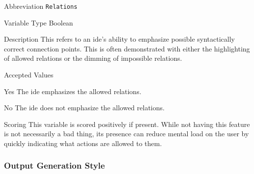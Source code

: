 \begin{AlignedDesc}
  \item[Abbreviation] \texttt{Relations}

  \item[Variable Type] Boolean

  \item[Description] This refers to an \ac{ide}'s ability to emphasize
  possible syntactically correct connection points. This is often
  demonstrated with either the highlighting of allowed relations or the
  dimming of impossible relations.

  \item[Accepted Values]

  \begin{AlignedDesc}
    \item[Yes] The \ac{ide} emphasizes the allowed relations.
    \item[No] The \ac{ide} does not emphasize the allowed relations.
  \end{AlignedDesc}

  \item[Scoring] This variable is scored positively if present. While not
  having this feature is not necessarily a bad thing, its presence can
  reduce mental load on the user by quickly indicating what actions are
  allowed to them.

\end{AlignedDesc}

\subsubsection{Output Generation Style}
\label{subsubsec:output}

